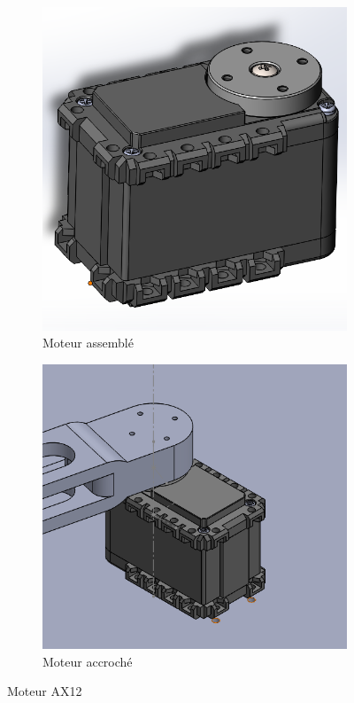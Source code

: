 \documentclass[a4paper, 11pt]{report}
\begin{document}
\begin{figure}[h]
    \centering
    \begin{subfigure}[t]{0.45\textwidth}
        \centering
        \includegraphics[width=\textwidth]{Figures/moteur_AX12.png}
        \caption{Moteur assemblé}
    \end{subfigure}
    \hfill
    \begin{subfigure}[t]{0.50\textwidth}
        \centering
        \includegraphics[width=\textwidth]{Figures/moteur_accroche.png}
        \caption{Moteur accroché}
    \end{subfigure}
    \caption{Moteur AX12}
    \label{fig:moteur}
\end{figure}
\end{document}
